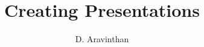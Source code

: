 \documentclass{beamer}
\title{Creating Presentations}
\author{D. Aravinthan}
\begin{document}
\begin{frame}
  \titlepage
\end{frame}
\begin{comment}
\begin{frame}
  \frametitle{Overlays - Pause}
\begin{enumerate}
\item Shown from first slide on.
\pause
\item Shown from second slide on.
\pause
\item Shown from third slide on.
\pause
\item Shown from fourth slide on.
\end{enumerate}
\end{frame}
\begin{frame}
  \frametitle{Overlays - Specifications}
\begin{itemize}
\item<1-> Shown from first slide on.
\item<2-> Shown from second slide on.
\item<4> Shown only in forth slide.
\item<3,5-> Shown in 3., 5. and all
further slides.
\end{itemize}
\end{frame}
\end{comment}
\end{document}
